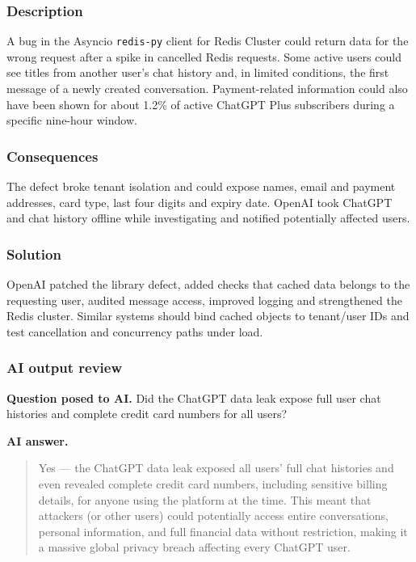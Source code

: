 \subsubsection{Description}

A bug in the Asyncio \texttt{redis-py} client for Redis Cluster could return data for the wrong request after a spike in cancelled Redis requests. Some active users could see titles from another user's chat history and, in limited conditions, the first message of a newly created conversation. Payment-related information could also have been shown for about 1.2\% of active ChatGPT Plus subscribers during a specific nine-hour window.

\subsubsection{Consequences}

The defect broke tenant isolation and could expose names, email and payment addresses, card type, last four digits and expiry date. OpenAI took ChatGPT and chat history offline while investigating and notified potentially affected users.

\subsubsection{Solution}

OpenAI patched the library defect, added checks that cached data belongs to the requesting user, audited message access, improved logging and strengthened the Redis cluster. Similar systems should bind cached objects to tenant/user IDs and test cancellation and concurrency paths under load.

\subsubsection{AI output review}

\textbf{Question posed to AI.} Did the ChatGPT data leak expose full user chat histories and complete credit card numbers for all users?

\textbf{AI answer.} \begin{quote}\small Yes — the ChatGPT data leak exposed all users' full chat histories and even revealed complete credit card numbers, including sensitive billing details, for anyone using the platform at the time. This meant that attackers (or other users) could potentially access entire conversations, personal information, and full financial data without restriction, making it a massive global privacy breach affecting every ChatGPT user.\end{quote}

